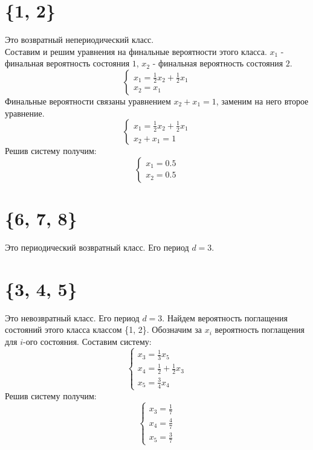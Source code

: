 \documentclass [a4paper,12pt]{article}
\begin{document}
\section{\{1, 2\}}
Это возвратный непериодический класс.\\
Составим и решим уравнения на финальные вероятности этого класса. $x_1$ - финальная вероятность состояния $1$, $x_2$ - финальная вероятность состояния $2$.\\
\begin{equation*}
 \begin{cases}
   x_1=\frac{1}{2}x_2+\frac{1}{2}x_1
   \\
   x_2 = x_1
 \end{cases}
\end{equation*}
Финальные вероятности связаны уравнением  $x_2 + x_1 = 1$, заменим на него второе уравнение.\\
\begin{equation*}
 \begin{cases}
   x_1=\frac{1}{2}x_2+\frac{1}{2}x_1
   \\
   x_2 + x_1 = 1
 \end{cases}
\end{equation*}
Решив систему получим:\\
\begin{equation*}
 \begin{cases}
   x_1=0.5
   \\
   x_2=0.5
 \end{cases}
\end{equation*}
\section{\{6, 7, 8\}}
Это периодический возвратный класс. Его период $d=3$.\\
\section{\{3, 4, 5\}}
Это невозвратный класс. Его период $d=3$. Найдем вероятность поглащения состояний этого класса классом \{1, 2\}. Обозначим за $x_i$ вероятность поглащения для $i$-ого состояния. Составим систему:\\
\begin{equation*}
 \begin{cases}
  x_3=\frac{1}{3}x_5
   \\
   x_4=\frac{1}{2} + \frac{1}{2}x_3
   \\
   x_5=\frac{3}{4}x_4
 \end{cases}
\end{equation*}
Решив систему получим:\\
\begin{equation*}
 \begin{cases}
  x_3=\frac{1}{7}
   \\
   x_4=\frac{4}{7}
   \\
   x_5=\frac{3}{7}
 \end{cases}
\end{equation*}
\end{document}
